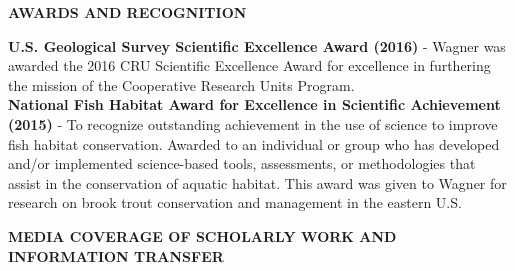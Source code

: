 \documentclass[10pt]{article}
\begin{document}
\begin{flushleft}
\centerline {\bf{AWARDS AND RECOGNITION}}
\vspace{5pt}
{\bf U.S. Geological Survey Scientific Excellence Award (2016)} - Wagner was awarded the 2016 CRU Scientific Excellence Award for excellence in furthering the mission of the Cooperative Research Units Program.\\
\vspace{6pt}
{\bf National Fish Habitat Award for Excellence in Scientific Achievement  (2015)} - To recognize outstanding achievement in the use of science to improve fish habitat conservation. Awarded to an individual or group who has developed and/or implemented science-based tools, assessments, or methodologies that assist in the conservation of aquatic habitat. This award was given to Wagner for research on brook trout conservation and management in the eastern U.S.\\

\vspace{5pt}
\vspace{6pt}
\centerline {\bf{MEDIA COVERAGE OF SCHOLARLY WORK AND INFORMATION TRANSFER}}
\vspace{5pt}



\end{flushleft}
\end{document}
